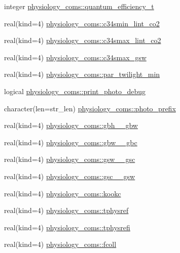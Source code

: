 \begin{DoxyCompactItemize}
integer \hyperlink{namespacephysiology__coms_acc7c98056c927d22975df63295e7d8eb}{physiology\+\_\+coms\+::quantum\+\_\+efficiency\+\_\+t}
\item 
real(kind=4) \hyperlink{namespacephysiology__coms_aff3389c10c3252e32b514150d2d601ee}{physiology\+\_\+coms\+::c34smin\+\_\+lint\+\_\+co2}
\item 
real(kind=4) \hyperlink{namespacephysiology__coms_a62fb9fb182c231b4376b0b879ff34699}{physiology\+\_\+coms\+::c34smax\+\_\+lint\+\_\+co2}
\item 
real(kind=4) \hyperlink{namespacephysiology__coms_af33f3bc89a2177f836b4ae9013e35bef}{physiology\+\_\+coms\+::c34smax\+\_\+gsw}
\item 
real(kind=4) \hyperlink{namespacephysiology__coms_a1c3d183c463f09e3e18b16a2bac5c887}{physiology\+\_\+coms\+::par\+\_\+twilight\+\_\+min}
\item 
logical \hyperlink{namespacephysiology__coms_afdf6c3084ba85f92a6ac66ac88ec7591}{physiology\+\_\+coms\+::print\+\_\+photo\+\_\+debug}
\item 
character(len=str\+\_\+len) \hyperlink{namespacephysiology__coms_a2c980690ad445a3f111aded7d288008c}{physiology\+\_\+coms\+::photo\+\_\+prefix}
\item 
real(kind=4) \hyperlink{namespacephysiology__coms_aa4949b861f6e1bce2fc1e5967a92724f}{physiology\+\_\+coms\+::gbh\+\_\+\_\+gbw}
\item 
real(kind=4) \hyperlink{namespacephysiology__coms_adfbb266baf2d2adc77509b82f4271ac8}{physiology\+\_\+coms\+::gbw\+\_\+\_\+gbc}
\item 
real(kind=4) \hyperlink{namespacephysiology__coms_adf37725d15d69bf28dee128f9712dd62}{physiology\+\_\+coms\+::gsw\+\_\+\_\+gsc}
\item 
real(kind=4) \hyperlink{namespacephysiology__coms_a2d716763934e1b78fb7be2d3080663c6}{physiology\+\_\+coms\+::gsc\+\_\+\_\+gsw}
\item 
real(kind=4) \hyperlink{namespacephysiology__coms_a141a8141098b73d902febd2617e1eb35}{physiology\+\_\+coms\+::kookc}
\item 
real(kind=4) \hyperlink{namespacephysiology__coms_a1ddecfcd801722fae0a28e4495a8b58f}{physiology\+\_\+coms\+::tphysref}
\item 
real(kind=4) \hyperlink{namespacephysiology__coms_a2ab9832e0895c53fecec95dd004f9a6c}{physiology\+\_\+coms\+::tphysrefi}
\item 
real(kind=4) \hyperlink{namespacephysiology__coms_a27a1df432bb5efa255a5dc1eb52539ec}{physiology\+\_\+coms\+::fcoll}
\item 

\end{DoxyCompactItemize}
